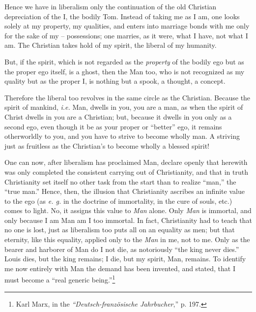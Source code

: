\documentclass[12pt,a4paper]{book}
\begin{document}
Hence we have in liberalism only the continuation of the old Christian 
depreciation of the I, the bodily Tom. Instead of taking me as I am, one looks 
solely at my property, my qualities, and enters into marriage bonds with me 
only for the sake of my -- possessions; one marries, as it were, what I have, 
not what I am. The Christian takes hold of my spirit, the liberal of my 
humanity.

But, if the spirit, which is not regarded as the \textit{property} of the 
bodily ego but as the proper ego itself, is a ghost, then the Man too, who is 
not recognized as my quality but as the proper I, is nothing but a spook, a 
thought, a concept.

Therefore the liberal too revolves in the same circle as the Christian. 
Because the spirit of mankind, \textit{i.e.} Man, dwells in you, you are a 
man, as when the spirit of Christ dwells in you are a Christian; but, because 
it dwells in you only as a second ego, even though it be as your proper or 
``better'' ego, it remains otherworldly to you, and you have to strive to 
become wholly man. A striving just as fruitless as the Christian's to become 
wholly a blessed spirit!

One can now, after liberalism has proclaimed Man, declare openly that herewith 
was only completed the consistent carrying out of Christianity, and that in 
truth Christianity set itself no other task from the start than to realize 
``man,'' the ``true man.'' Hence, then, the illusion that Christianity 
ascribes an infinite value to the ego (as \textit{e. g.} in the doctrine of 
immortality, in the cure of souls, etc.) comes to light. No, it assigns this 
value to \textit{Man} alone. Only \textit{Man} is immortal, and only because I 
am Man am I too immortal. In fact, Christianity had to teach that no one is 
lost, just as liberalism too puts all on an equality as men; but that 
eternity, like this equality, applied only to the \textit{Man} in me, not to 
me. Only as the bearer and harborer of Man do I not die, as notoriously ``the 
king never dies.'' Louis dies, but the king remains; I die, but my spirit, 
Man, remains. To identify me now entirely with Man the demand has been 
invented, and stated, that I must become a ``real generic 
being.''\footnote{Karl Marx, in the \textit{``Deutsch-franz\"osische 
Jahrbucher},'' p. 197.}
\end{document}
